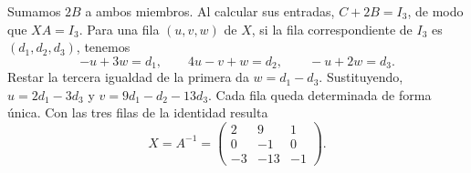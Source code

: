 Sumamos $2B$ a ambos miembros. Al calcular sus entradas, $C+2B=I_3$, de modo que $XA=I_3$. Para una fila $(u,v,w)$ de $X$, si la fila correspondiente de $I_3$ es $(d_1,d_2,d_3)$, tenemos
\[
-u+3w=d_1,\qquad 4u-v+w=d_2,\qquad -u+2w=d_3.
\]
Restar la tercera igualdad de la primera da $w=d_1-d_3$. Sustituyendo, $u=2d_1-3d_3$ y $v=9d_1-d_2-13d_3$. Cada fila queda determinada de forma única. Con las tres filas de la identidad resulta
\[
X=A^{-1}=\boxed{\begin{pmatrix}2&9&1\\0&-1&0\\-3&-13&-1\end{pmatrix}}.
\]
